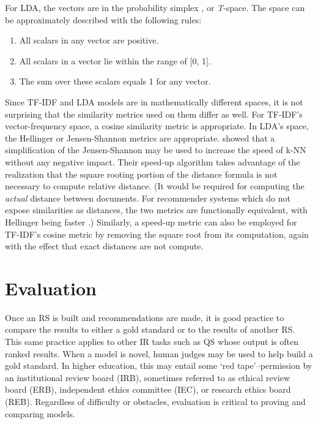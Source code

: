 For LDA, the vectors are in the probability simplex \citep{blei2003latent}, or \textit{T}-space. The space can be approximately described with the following rules:

\begin{enumerate}
    \item All scalars in any vector are positive.
    \item All scalars in a vector lie within the range of [0, 1].
    \item The sum over these scalars equals 1 for any vector.
\end{enumerate}

Since TF-IDF and LDA models are in mathematically different spaces, it is not surprising that the similarity metrics used on them differ as well. For TF-IDF's vector-frequency space, a cosine similarity metric is appropriate. In LDA's space, the Hellinger or Jensen-Shannon metrics are appropriate. \cite{Krstovski2013efficient} showed that a simplification of the Jensen-Shannon may be used to increase the speed of k-NN without any negative impact. Their speed-up algorithm takes advantage of the realization that the square rooting portion of the distance formula is not necessary to compute relative distance. (It would be required for computing the \textit{actual} distance between documents. For recommender systems which do not expose similarities as distances, the two metrics are functionally equivalent, with Hellinger being faster \cite{Krstovski2013efficient}.) Similarly, a speed-up metric can also be employed for TF-IDF's cosine metric by removing the square root from its computation, again with the effect that exact distances are not compute. %

\section{Evaluation}
Once an RS is built and recommendations are made, it is good practice to compare the results to either a gold standard or to the results of another RS. This same practice applies to other IR tasks such as QS whose output is often ranked results. When a model is novel, human judges may be used to help build a gold standard. In higher education, this may entail some `red tape'--permission by an institutional review board (IRB), sometimes referred to as ethical review board (ERB), independent ethics committee (IEC), or research ethics board (REB). Regardless of difficulty or obstacles, evaluation is critical to proving and comparing models.

